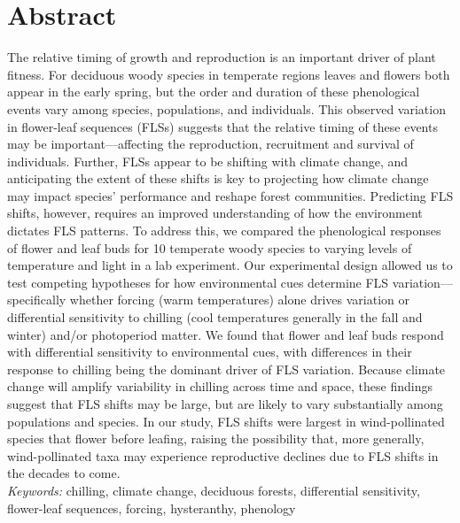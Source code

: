 \documentclass[11pt]{article}\usepackage[]{graphicx}\usepackage[]{color}
\begin{document}
\section*{Abstract} 
The relative timing of growth and reproduction is an important driver of plant fitness. For deciduous woody species in temperate regions leaves and flowers both appear in the early spring, but the order and duration of these phenological events vary among species, populations, and individuals. This observed variation in flower-leaf sequences (FLSs) suggests that the relative timing of these events may be important---affecting the reproduction, recruitment and survival of individuals. Further, FLSs appear to be shifting with climate change, and anticipating the extent of these shifts is key to projecting how climate change may impact species' performance and reshape forest communities. Predicting FLS shifts, however, requires an improved understanding of how the environment dictates FLS patterns. To address this, we compared the phenological responses of flower and leaf buds for 10 temperate woody species to varying levels of temperature and light in a lab experiment. Our experimental design allowed us to test competing hypotheses for how environmental cues determine FLS variation---specifically whether forcing (warm temperatures) alone drives variation or differential sensitivity to chilling (cool temperatures generally in the fall and winter) and/or photoperiod matter. We found that flower and leaf buds respond with differential sensitivity to environmental cues, with differences in their response to chilling being the dominant driver of FLS variation. Because climate change will amplify variability in chilling across time and space, these findings suggest that FLS shifts may be large, but are likely to vary substantially among populations and species. In our study, FLS shifts were largest in wind-pollinated species that flower before leafing, raising the possibility that, more generally, wind-pollinated taxa may experience reproductive declines due to FLS shifts in the decades to come.   \\ %

\noindent \emph{Keywords:} chilling, climate change, deciduous forests, differential sensitivity, flower-leaf sequences, forcing, hysteranthy, phenology  \\ 
\end{document}
